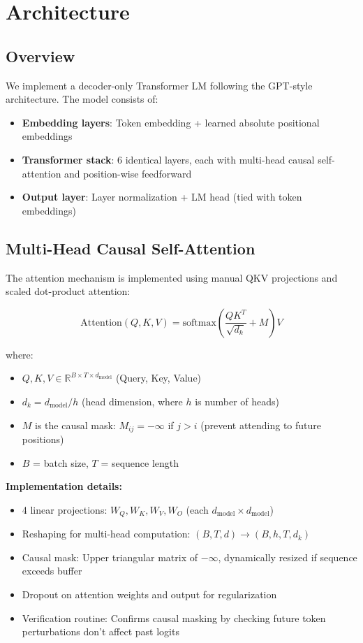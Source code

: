 \documentclass[11pt,a4paper]{article}
\begin{document}
\section{Architecture}

\subsection{Overview}

We implement a decoder-only Transformer LM following the GPT-style architecture. The model consists of:

\begin{itemize}
    \item \textbf{Embedding layers}: Token embedding + learned absolute positional embeddings
    \item \textbf{Transformer stack}: 6 identical layers, each with multi-head causal self-attention and position-wise feedforward
    \item \textbf{Output layer}: Layer normalization + LM head (tied with token embeddings)
\end{itemize}

\subsection{Multi-Head Causal Self-Attention}

The attention mechanism is implemented using manual QKV projections and scaled dot-product attention:

\begin{equation}
\text{Attention}(Q, K, V) = \text{softmax}\left(\frac{QK^T}{\sqrt{d_k}} + M\right)V
\end{equation}

where:
\begin{itemize}
    \item $Q, K, V \in \mathbb{R}^{B \times T \times d_{\text{model}}}$ (Query, Key, Value)
    \item $d_k = d_{\text{model}} / h$ (head dimension, where $h$ is number of heads)
    \item $M$ is the causal mask: $M_{ij} = -\infty$ if $j > i$ (prevent attending to future positions)
    \item $B$ = batch size, $T$ = sequence length
\end{itemize}

\textbf{Implementation details:}
\begin{itemize}
    \item 4 linear projections: $W_Q, W_K, W_V, W_O$ (each $d_{\text{model}} \times d_{\text{model}}$)
    \item Reshaping for multi-head computation: $(B, T, d) \to (B, h, T, d_k)$
    \item Causal mask: Upper triangular matrix of $-\infty$, dynamically resized if sequence exceeds buffer
    \item Dropout on attention weights and output for regularization
    \item Verification routine: Confirms causal masking by checking future token perturbations don't affect past logits
\end{itemize}
\end{document}
